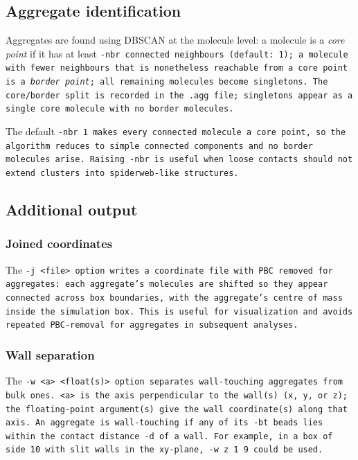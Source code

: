 \subsection{Aggregate identification} \label{subsec:Aggregates-dbscan}

Aggregates are found using DBSCAN at the molecule level: a molecule is a
\emph{core point} if it has at least \tt{-nbr} connected neighbours (default:
1); a molecule with fewer neighbours that is nonetheless reachable from a core
point is a \emph{border point}; all remaining molecules become singletons. The
core/border split is recorded in the \tt{.agg} file; singletons appear as a
single core molecule with no border molecules.

The default \tt{-nbr 1} makes every connected molecule a core point, so the
algorithm reduces to simple connected components and no border molecules arise.
Raising \tt{-nbr} is useful when loose contacts should not extend clusters into
spiderweb-like structures.

\subsection{Additional output} \label{subsec:Aggregates-output}

\subsubsection*{Joined coordinates}

The \tt{-j <file>} option writes a coordinate file with PBC removed for
aggregates: each aggregate's molecules are shifted so they appear connected
across box boundaries, with the aggregate's centre of mass inside the simulation
box. This is useful for visualization and avoids repeated PBC-removal for
aggregates in subsequent analyses.

\subsubsection*{Wall separation}

The \tt{-w <a> <float(s)>} option separates wall-touching aggregates from bulk
ones. \tt{<a>} is the axis perpendicular to the wall(s) (\tt{x}, \tt{y}, or
\tt{z}); the floating-point argument(s) give the wall coordinate(s) along that
axis. An aggregate is wall-touching if any of its \tt{-bt} beads lies within the
contact distance \tt{-d} of a wall. For example, in a box of side 10 with slit
walls in the xy-plane, \tt{-w z 1 9} could be used.

